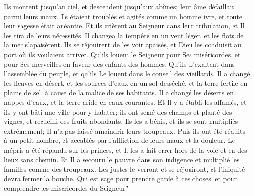 {\VERSE Ils montent jusqu'au ciel, et descendent jusqu'aux abîmes; leur âme défaillait parmi leurs maux. \EVERSE
\VERSE Ils étaient troublés et agités comme un homme ivre, et toute leur sagesse était anéantie. \EVERSE
\VERSE Et ils crièrent au Seigneur dans leur tribulation, et Il les tira de leurs nécessités. \EVERSE
\VERSE Il changea la tempête en un vent léger, et les flots de la mer s'apaisèrent. \EVERSE
\VERSE Ils se réjouirent de les voir apaisés, et Dieu les conduisit au port où ils voulaient arriver. \EVERSE
\VERSE Qu'ils louent le Seigneur pour Ses miséricordes, et pour Ses merveilles en faveur des enfants des hommes. \EVERSE
\VERSE Qu'ils L'exaltent dans l'assemblée du peuple, et qu'ils Le louent dans le conseil des vieillards. \EVERSE
\VERSE Il a changé les fleuves en désert, et les sources d'eaux en un sol desséché, \EVERSE
\VERSE et la terre fertile en plaine de sel, à cause de la malice de ses habitants. \EVERSE
\VERSE Il a changé les déserts en nappes d'eaux, et la terre aride en eaux courantes. \EVERSE
\VERSE Et Il y a établi les affamés, et ils y ont bâti une ville pour y habiter; \EVERSE
\VERSE ils ont semé des champs et planté des vignes, et recueilli des fruits abondants. \EVERSE
\VERSE Ils les a bénis, et ils se sont multipliés extrêmement; Il n'a pas laissé amoindrir leurs troupeaux. \EVERSE
\VERSE Puis ils ont été réduits à un petit nombre, et accablés par l'affliction de leurs maux et la douleur. \EVERSE
\VERSE Le mépris a été répandu sur les princes, et Il les a fait errer hors de la voie et en des lieux sans chemin. \EVERSE
\VERSE Et Il a secouru le pauvre dans son indigence et multiplié les familles comme des troupeaux. \EVERSE
\VERSE Les justes le verront et se réjouiront, et l'iniquité devra fermer la bouche. \EVERSE
\VERSE Qui est sage pour prendre garde à ces choses, et pour comprendre les miséricordes du Seigneur?

}
